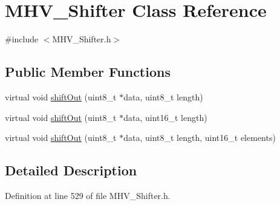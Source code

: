 \hypertarget{class_m_h_v___shifter}{
\section{\-M\-H\-V\-\_\-\-Shifter \-Class \-Reference}
\label{class_m_h_v___shifter}
}


{\ttfamily \#include $<$\-M\-H\-V\-\_\-\-Shifter.\-h$>$}

\subsection*{\-Public \-Member \-Functions}
\begin{DoxyCompactItemize}
\item 
virtual void \hyperlink{class_m_h_v___shifter_a1f28dce58f9b2740ca3e398a8fa01030}{shift\-Out} (uint8\-\_\-t $\ast$data, uint8\-\_\-t length)
\item 
virtual void \hyperlink{class_m_h_v___shifter_a259e0a8c7273fd79fb48675dad7843e6}{shift\-Out} (uint8\-\_\-t $\ast$data, uint16\-\_\-t length)
\item 
virtual void \hyperlink{class_m_h_v___shifter_ade6314278768732410611bad1615d093}{shift\-Out} (uint8\-\_\-t $\ast$data, uint8\-\_\-t length, uint16\-\_\-t elements)
\end{DoxyCompactItemize}


\subsection{\-Detailed \-Description}


\-Definition at line 529 of file \-M\-H\-V\-\_\-\-Shifter.\-h.



